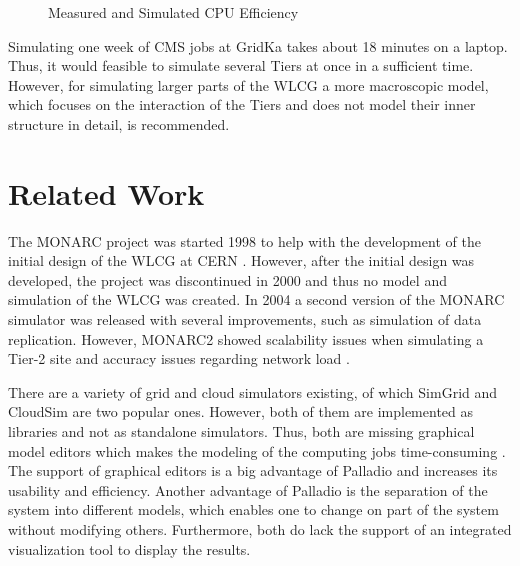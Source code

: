 \documentclass[a4paper]{jpconf}
\begin{document}
\begin{figure}[h]
	\caption[]{Measured and Simulated CPU Efficiency}
	\label{utilization}
\end{figure}

Simulating one week of CMS jobs at GridKa takes about 18 minutes on a laptop. Thus, it would feasible to simulate several Tiers at once in a sufficient time. However, for simulating larger parts of the WLCG a more macroscopic model, which focuses on the interaction of the Tiers and does not model their inner structure in detail,
is recommended. 


\section{Related Work}
\label{related}
The MONARC project was started 1998 to help with the development of the initial design of the WLCG at CERN \cite{monarc2000models}.
However, after the initial design was developed, the project was discontinued in 2000 and thus no model and simulation of the WLCG was created. 
In 2004 a second version of the MONARC simulator was released with several improvements, such as simulation of data replication. However, MONARC2 showed scalability issues when simulating a Tier-2 site and accuracy issues regarding network load \cite{1742-6596-331-7-072038}.

There are a variety of grid and cloud simulators existing, of which SimGrid and CloudSim are two popular ones. 
However, both of them are implemented as libraries and not as standalone simulators. Thus, both are missing graphical model editors which makes the modeling of the computing jobs time-consuming \cite{simgrid,cloudsim}. The support of graphical editors is a big advantage of Palladio and increases its usability and efficiency. Another advantage of Palladio is the separation of the system into different models, which enables one to change on part of the system without modifying others. Furthermore, both do lack the support of an integrated visualization tool to display the results.  
\end{document}
